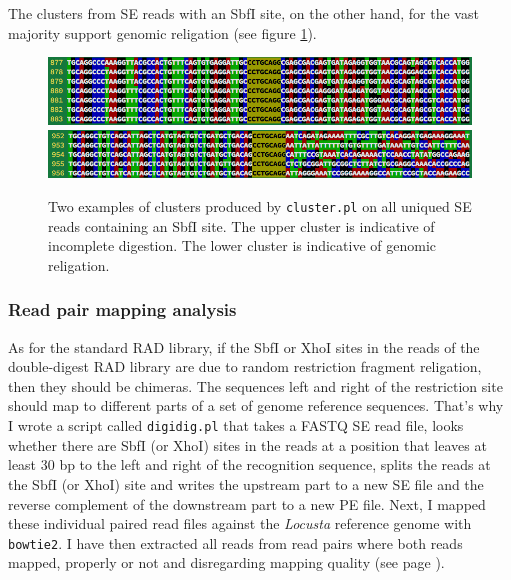 \documentclass[a4paper,12pt,times,print,index,custombib,custommargin]{PhDThesisPSnPDF}\usepackage[]{graphicx}\usepackage[]{color}
\begin{document}
%
The clusters from SE reads with an SbfI site, on the other hand, for the vast majority support genomic religation (see figure \ref{all_ind_SbfI_in_SE_cl_by_pos_1}). %
\begin{figure}
\centering
\includegraphics[width=.9\textwidth]{all_ind_SbfI_in_SE_cl_by_pos_1}\\
\vspace{10pt}
\includegraphics[width=.9\textwidth]{all_ind_SbfI_in_SE_cl_by_pos_2}
\caption{Two examples of clusters produced by \texttt{cluster.pl} on all uniqued SE reads containing an SbfI site. The upper cluster is indicative of incomplete digestion. The lower cluster is indicative of genomic religation.}
\label{all_ind_SbfI_in_SE_cl_by_pos_1}
\end{figure}

\subsubsection{Read pair mapping analysis}


As for the standard RAD library, if the SbfI or XhoI sites in the reads of the double-digest RAD library are due to random restriction fragment religation, then they should be chimeras. The sequences left and right of the restriction site should map to different parts of a set of genome reference sequences.
That's why I wrote a script called \texttt{digidig.pl} that takes a FASTQ SE read file, looks whether there are SbfI (or XhoI) sites in the reads at a position that leaves at least 30 bp to the left and right of the recognition sequence, splits the reads at the SbfI (or XhoI) site and writes the upstream part to a new SE file and the reverse complement of the downstream part to a new PE file. Next, I mapped these individual paired read files against the \textit{Locusta} reference genome \citep{Wang2014} with \texttt{bowtie2}. I have then extracted all reads from read pairs where both reads mapped, properly or not and disregarding mapping quality (see page \pageref{read_pair_mapping_analysis}).
\end{document}
